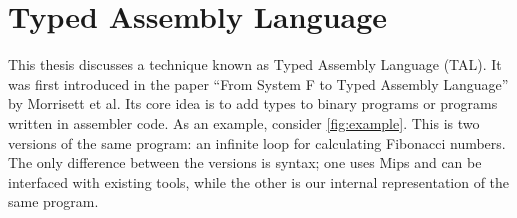 \section{Typed Assembly Language}

This thesis discusses a technique known as Typed Assembly Language (TAL). It was
first introduced in the paper ``From System F to Typed Assembly
Language''\cite{TAL} by Morrisett et al. Its core idea is to add types to binary
programs or programs written in assembler code. As an example, consider
\cref{fig:example}. This is two versions of the same program: an infinite loop
for calculating Fibonacci numbers. The only difference between the versions is
syntax; one uses Mips\cite{mipssys} and can be interfaced with existing tools,
while the other is our internal representation of the same program.

